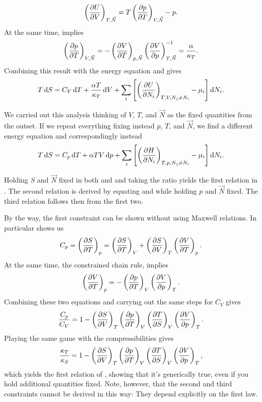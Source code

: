 \begin{equation}\label{eq:energyEquation}
\left(\pdv{U}{V}\right)_{T,\vec{N}}
=T\left(\pdv{p}{T}\right)_{V,\vec{N}}-p.
\end{equation}
At the same time,  implies
\begin{equation}\label{eq:dpdTalphakappa}
\left(\pdv{p}{T}\right)_{V,\vec{N}}
=-\left(\pdv{V}{T}\right)_{p,\vec{N}}\left(\pdv{V}{p}\right)_{T,\vec{N}}^{-1}
=\frac{\alpha}{\kappa_T}.
\end{equation} 
Combining this result with the energy equation and
 gives 
\begin{equation}\label{eq:TdS1}
T\dd{S} = C_V \dd{T} + \frac{\alpha T}{\kappa_T}\dd{V}
+ \sum_i \left[\left(\pdv{U}{N_i}\right)_{T,V,N_j\neq N_i}-\mu_i\right]\dd N_i.
\end{equation}

We carried out this analysis thinking of $V$, $T$, and $\vec{N}$ as the fixed
quantities from the outset. If we repeat everything fixing instead $p$, $T$, and
$\vec{N}$, we find a different energy equation and correspondingly instead
\begin{equation}\label{eq:TdS2}
T\dd{S} = C_p \dd{T} + \alpha T V\dd{p}
+ \sum_i \left[\left(\pdv{H}{N_i}\right)_{T,p,N_j\neq N_i}-\mu_i\right]\dd N_i.
\end{equation}

Holding $S$ and $\vec{N}$ fixed in both
 and  and taking the ratio
yields the first relation in .
The second relation is derived by equating  and 
 while holding $p$ and $\vec{N}$ fixed.
The third relation follows then from the first two. 

By the way, the first constraint can be shown without using Maxwell relations.
In particular  shows us
\begin{equation}
C_p=\left(\pdv{S}{T}\right)_{p}=\left(\pdv{S}{T}\right)_{V}+\left(\pdv{S}{V}\right)_{T}\left(\pdv{V}{T}\right)_{p}.
\end{equation}
At the same time, the constrained chain rule, 
implies
\begin{equation}
\left(\pdv{V}{T}\right)_{p}=-\left(\pdv{p}{T}\right)_{V}\left(\pdv{V}{p}\right)_{T}.
\end{equation}
Combining these two equations and carrying out the same steps for $C_V$ gives
\begin{equation}
\frac{C_p}{C_V}=1-
\left(\pdv{S}{V}\right)_{T}\left(\pdv{p}{T}\right)_{V}\left(\pdv{T}{S}\right)_{V}\left(\pdv{V}{p}\right)_{T}.
\end{equation}
Playing the same game with the compressibilities gives
\begin{equation}
\frac{\kappa_T}{\kappa_S}=1-
\left(\pdv{S}{V}\right)_{T}\left(\pdv{p}{T}\right)_{V}\left(\pdv{T}{S}\right)_{V}\left(\pdv{V}{p}\right)_{T},
\end{equation}
which yields the first relation of , showing that
it's generically true, even if you hold additional quantities fixed. Note,
however, that the second and third constraints cannot be derived in this way: They
depend explicitly on the first law.

